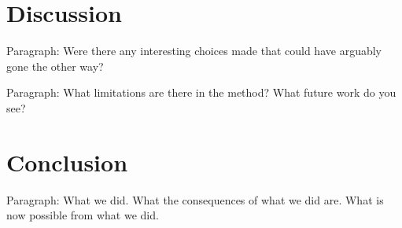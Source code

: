 \section{Discussion}

Paragraph: Were there any interesting choices made that could have arguably gone the other way?

Paragraph: What limitations are there in the method? What future work do you see?

\section{Conclusion}

Paragraph: What we did. What the consequences of what we did are. What is now possible from what we did.